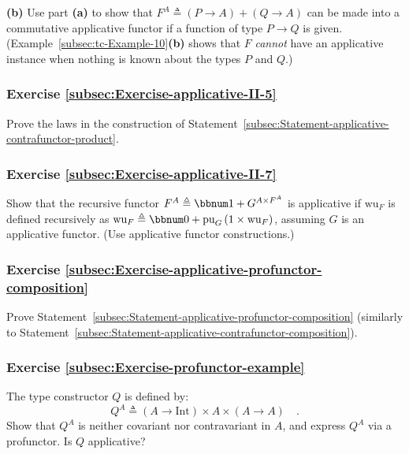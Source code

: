 \textbf{(b)} Use part \textbf{(a)} to show that $F^{A}\triangleq(P\rightarrow A)+(Q\rightarrow A)$
can be made into a commutative applicative functor if a function of
type $P\rightarrow Q$ is given. (Example~\ref{subsec:tc-Example-10}\textbf{(b)}
shows that $F$ \emph{cannot} have an applicative instance when nothing
is known about the types $P$ and $Q$.)

\subsubsection{Exercise \label{subsec:Exercise-applicative-II-5}\ref{subsec:Exercise-applicative-II-5}}

Prove the laws in the construction of Statement~\ref{subsec:Statement-applicative-contrafunctor-product}.

\subsubsection{Exercise \label{subsec:Exercise-applicative-II-7}\ref{subsec:Exercise-applicative-II-7}}

Show that the recursive functor $F^{A}\triangleq\bbnum 1+G^{A\times F^{A}}$
is applicative if $\text{wu}_{F}$ is defined recursively as $\text{wu}_{F}\triangleq\bbnum 0+\text{pu}_{G}\left(1\times\text{wu}_{F}\right)$,
assuming $G$ is an applicative functor. (Use applicative functor
constructions.)

\subsubsection{Exercise \label{subsec:Exercise-applicative-profunctor-composition}\ref{subsec:Exercise-applicative-profunctor-composition}}

Prove Statement~\ref{subsec:Statement-applicative-profunctor-composition}
(similarly to Statement~\ref{subsec:Statement-applicative-contrafunctor-composition}).

\subsubsection{Exercise \label{subsec:Exercise-profunctor-example}\ref{subsec:Exercise-profunctor-example}}

The type constructor $Q$ is defined by: 
\[
Q^{A}\triangleq\left(A\rightarrow\text{Int}\right)\times A\times\left(A\rightarrow A\right)\quad.
\]
Show that $Q^{A}$ is neither covariant nor contravariant in $A$,
and express $Q^{A}$ via a profunctor. Is $Q$ applicative?

